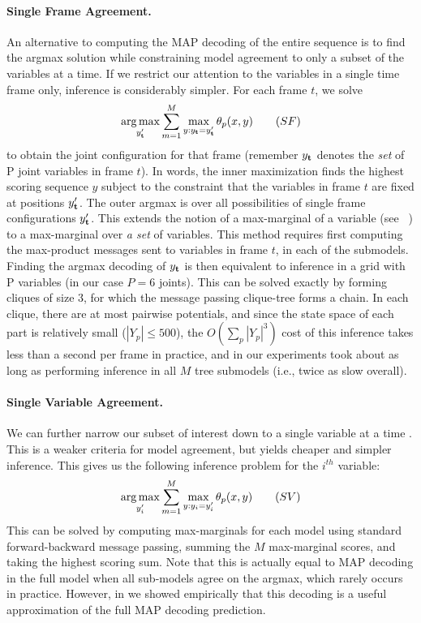\paragraph{Single Frame Agreement.} An alternative to computing the
MAP decoding of the entire sequence is to find the argmax solution
while constraining model agreement to only a subset of the variables
at a time.  If we restrict our attention to the variables in a single
time frame only, inference is considerably simpler.  For each frame
$t$, we solve
\begin{equation}
\mathop{\arg\max}_{y_{\bf{t}}'} \sum_{m=1}^M \max_{y : y_{\bf{t}} = y_{\bf{t}}'} \theta_p(x,y) \quad{}\quad{(SF)}
\end{equation}
to obtain the joint configuration for that frame (remember $y_{\bf t}$
denotes the {\em set} of P joint variables in frame $t$).  In words,
the inner maximization finds the highest scoring sequence $y$ subject to
the constraint that the variables in frame $t$ are fixed at positions
$y_{\bf t}'$.  The outer argmax is over all possibilities of single
frame configurations $y_{\bf t}'$.  This extends the notion of a
max-marginal of a variable (see ~\cite{weiss10}) to a max-marginal
over {\em a set} of variables.  This method requires first computing
the max-product messages sent to variables in frame $t$, in each of
the submodels.  Finding the argmax decoding of $y_{\bf t}$ is then
equivalent to inference in a grid with P variables (in our case $P=6$
joints).  This can be solved exactly by forming cliques of size 3, for
which the message passing clique-tree forms a chain.  In each clique,
there are at most pairwise potentials, and since the state space of
each part is relatively small ($|Y_p| \leq 500$), the $O(\sum_p
|Y_p|^3)$ cost of this inference takes less than a second per frame in
practice, and in our experiments took about as long as performing inference in all $M$ tree submodels (i.e., twice as slow overall).


\paragraph{Single Variable Agreement.} 

We can further narrow our subset of interest down to a single variable
at a time \cite{weisssapp10}.  This is a weaker criteria for model
agreement, but yields cheaper and simpler inference.  This gives us
the following inference problem for the $i^{th}$ variable:
\begin{equation}
\mathop{\arg\max}_{y_i'} \sum_{m=1}^M \max_{y: y_i=y_i'}\theta_p(x,y) \quad{}\quad{(SV)}
\end{equation}
This can be solved by computing max-marginals for each model using standard forward-backward message passing, summing the $M$ max-marginal scores, and taking the highest scoring sum.
Note that this is actually equal to MAP decoding in the full model when  
all sub-models agree on the argmax, which rarely occurs in practice. However, in \cite{weisssapp10} we showed
empirically that this decoding is a useful approximation
of the full MAP decoding prediction. 

